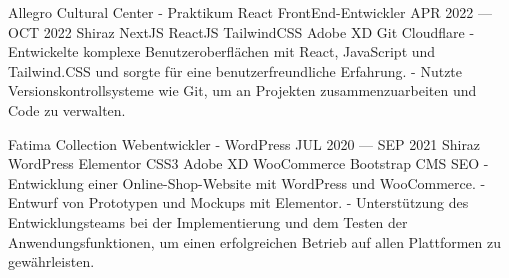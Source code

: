 

\begin{cventries}

\cventry
{Allegro Cultural Center - Praktikum} %
{React FrontEnd-Entwickler} %
{APR 2022 --- OCT 2022} %
{Shiraz} %
{
  NextJS \mitdiv ReactJS \mitdiv TailwindCSS \mitdiv Adobe XD \mitdiv Git \mitdiv Cloudflare
  \newline
  - Entwickelte komplexe Benutzeroberflächen mit React, JavaScript und Tailwind.CSS und sorgte für eine benutzerfreundliche Erfahrung.
  - Nutzte Versionskontrollsysteme wie Git, um an Projekten zusammenzuarbeiten und Code zu verwalten.
}
% 

\cventry
{Fatima Collection} %
{Webentwickler - WordPress} %
{JUL 2020 --- SEP 2021} %
{Shiraz} %
{
  WordPress \mitdiv Elementor \mitdiv CSS3 \mitdiv Adobe XD \mitdiv WooCommerce \mitdiv Bootstrap \mitdiv CMS \mitdiv SEO
  \newline
  - Entwicklung einer Online-Shop-Website mit WordPress und WooCommerce.
  - Entwurf von Prototypen und Mockups mit Elementor.
  - Unterstützung des Entwicklungsteams bei der Implementierung und dem Testen der 
  Anwendungsfunktionen, um einen erfolgreichen Betrieb auf allen Plattformen zu gewährleisten.
}

\end{cventries}
